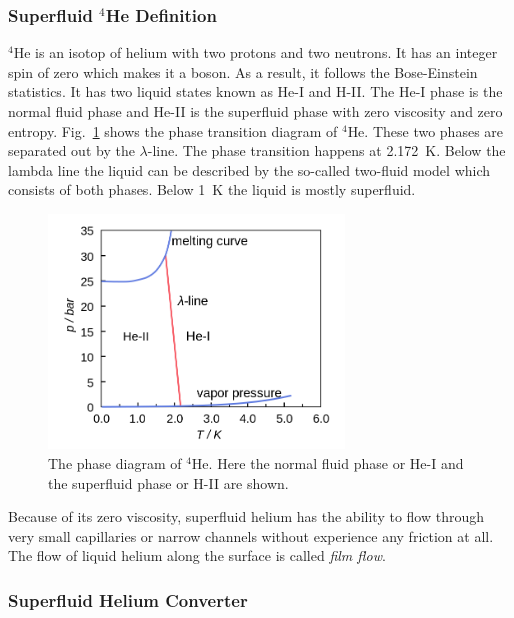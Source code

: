 \subsubsection{Superfluid $^4$He Definition}

$^4$He is an isotop of helium with two protons and two neutrons. It
has an integer spin of zero which makes it a boson. As a result, it
follows the Bose-Einstein statistics. It has two liquid states known
as He-I and H-II. The He-I phase is the normal fluid phase and He-II
is the superfluid phase with zero viscosity and zero
entropy. Fig.~\ref{fig:phasetransition} shows the phase transition
diagram of $^4$He. These two phases are separated out by the
$\lambda$-line. The phase transition happens at 2.172~K.  Below the
lambda line the liquid can be described by the so-called two-fluid
model which consists of both phases. Below 1~K the liquid is mostly
superfluid.

\begin{figure}[h!]
  \centering \includegraphics[width=0.7\textwidth]{phasetransition.png}
  \caption{The phase diagram of $^4$He. Here the normal fluid phase or
    He-I and the superfluid phase or H-II are shown.}
\label{fig:phasetransition}
\end{figure}

Because of its zero viscosity, superfluid helium has the ability to
flow through very small capillaries or narrow channels without
experience any friction at all. The flow of liquid helium along the
surface is called {\it{film flow}}.

 
\subsubsection{Superfluid Helium Converter}

